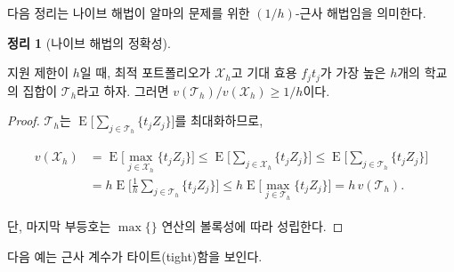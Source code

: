 \documentclass[11pt]{article} %
\newif\ifen
\newtheorem{theorem}{Theorem}
\theoremstyle{definition}
\newtheorem{theorem}{정리}
\theoremstyle{definition}
\begin{document}
\ifen
In fact, the na\"ive algorithm is a $(1/h)$-approximation algorithm for Alma’s problem, as expressed in the following theorem.
\else
다음 정리는 나이브 해법이 알마의 문제를 위한 $(1/h)$-근사 해법임을 의미한다.
\fi

\begin{theorem}[\ifen Accuracy of the na\"ive algorithm\else 나이브 해법의 정확성\fi] \label{oneoverhopt}
\ifen 
When the application limit is $h$, let $\mathcal{X}_h$ denote the optimal portfolio, and $\mathcal{T}_h$ the set of the $h$ schools having the largest values of $f_j t_j$. Then $v(\mathcal{T}_h) / v(\mathcal{X}_h) \geq 1/h$. 
\else
지원 제한이 $h$일 때, 최적 포트폴리오가 $\mathcal{X}_h$고 기대 효용 $f_j t_j$가 가장 높은 $h$개의 학교의 집합이 $\mathcal{T}_h$라고 하자. 그러면 $v(\mathcal{T}_h) / v(\mathcal{X}_h) \geq 1/h$이다.
\fi
\end{theorem}
\begin{proof}
\ifen
Because $\mathcal{T}_h$ maximizes the quantity $\operatorname{E}\bigl[ \sum_{j \in \mathcal{T}_h}\{ t_j Z_j \}\bigr]$, we have
\else
$\mathcal{T}_h$는 $\operatorname{E}\bigl[ \sum_{j \in \mathcal{T}_h}\{ t_j Z_j \}\bigr]$를 최대화하므로,
\fi
\begin{align} \label{oneoverhopt}
\begin{split}
v(\mathcal{X}_h) &= \operatorname{E}\bigl[ \max_{j \in \mathcal{X}_h}\{ t_j Z_j \}\bigr] \leq \operatorname{E}\bigl[ \sum_{j \in \mathcal{X}_h}\{ t_j Z_j \}\bigr] \leq \operatorname{E}\bigl[ \sum_{j \in \mathcal{T}_h}\{ t_j Z_j \}\bigr] \\
&= h  \operatorname{E}\bigl[ \tfrac{1}{h} \sum_{j \in \mathcal{T}_h}\{ t_j Z_j \}\bigr]
\leq h  \operatorname{E}\bigl[ \max_{j \in \mathcal{T}_h}\{ t_j Z_j \}\bigr]
= h\,v(\mathcal{T}_h).
\end{split}
\end{align}
\ifen 
where the final inequality follows from the concavity of the $\max\{\}$ operator.
\else
단, 마지막 부등호는 $\max\{\}$ 연산의 볼록성에 따라 성립한다.
\fi
\end{proof}

\ifen
The following example establishes the tightness of the approximation factor. 
\else
다음 예는 근사 계수가 타이트(tight)함을 보인다.
\fi
\end{document}
